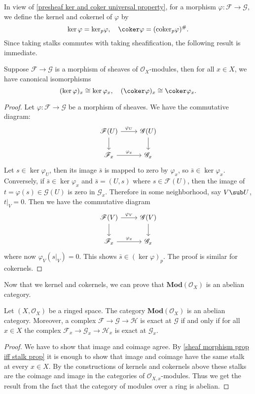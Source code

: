 In view of \cref{presheaf ker and coker universal property}, for a morphism $\varphi:\mathscr{F}\to\mathscr{G}$, we define the kernel and cokernel of $\varphi$ by
\[\ker\varphi=\mathrm{ker}_p\varphi,\quad \coker\varphi=(\mathrm{coker}_p\varphi)^{\#}.\]
Since taking stalks commutes with taking sheafification, the following result is immediate.
\begin{proposition}\label{sheaf ker coker and stalk prop}
Suppose $\mathscr{F}\to\mathscr{G}$ is a morphism of sheaves of $\mathscr{O}_X$-modules, then for all $x\in X$, we have canonical isomorphisms
\[(\ker\varphi)_x\cong\ker\varphi_x,\quad(\coker\varphi)_x\cong\coker\varphi_x.\]
\end{proposition}
\begin{proof}
Let $\varphi:\mathscr{F}\to\mathscr{G}$ be a morphism of sheaves. We have the commutative diagram:
\[\begin{tikzcd}
\mathscr{F}(U)\ar[r,"\varphi_U"]\ar[d]&\mathscr{G}(U)\ar[d]\\
\mathscr{F}_x\ar[r,"\varphi_x"]&\mathscr{G}_x
\end{tikzcd}\]
Let $s\in\ker\varphi_U$, then its image $\bar{s}$ is mapped to zero by $\varphi_x$, so $\bar{s}\in\ker\varphi_x$. Conversely, if $\bar{s}\in\ker\varphi_x$ and $\bar{s}=(U,s)$ where $s\in\mathscr{F}(U)$, then the image of $t=\varphi(s)\in\mathscr{G}(U)$ is zero in $\mathscr{G}_x$. Therefore in some neighborhood, say $V\sub U$, $t|_V=0$. Then we have the commutative diagram
\[\begin{tikzcd}
\mathscr{F}(V)\ar[r,"\varphi_V"]\ar[d]&\mathscr{G}(V)\ar[d]\\
\mathscr{F}_x\ar[r,"\varphi_x"]&\mathscr{G}_x
\end{tikzcd}\]
where now $\varphi_V(s|_V)=0$. This shows $\bar{s}\in(\ker\varphi)_p$. The proof is similar for cokernels.
\end{proof}
Now that we kernel and cokernels, we can prove that $\mathbf{Mod}(\mathscr{O}_X)$ is an abelian category.
\begin{theorem}\label{sheaf of module abelian cat exactness char}
Let $(X,\mathscr{O}_X)$ be a ringed space. The category $\mathbf{Mod}(\mathscr{O}_X)$ is an abelian category. Moreover, a complex $\mathscr{F}\to\mathscr{G}\to\mathscr{H}$ is exact at $\mathscr{G}$ if and only if for all $x\in X$ the complex $\mathscr{F}_x\to\mathscr{G}_x\to\mathscr{H}_x$ is exact at $\mathscr{G}_x$.
\end{theorem}
\begin{proof}
We have to show that image and coimage agree. By \cref{sheaf morphism prop iff stalk prop} it is enough to show that image and coimage have the same stalk at every $x\in X$. By the constructions of kernels and cokernels above these stalks are the coimage and image in the categories of $\mathscr{O}_{X,x}$-modules. Thus we get the result from the fact that the category of modules over a ring is abelian.
\end{proof}
